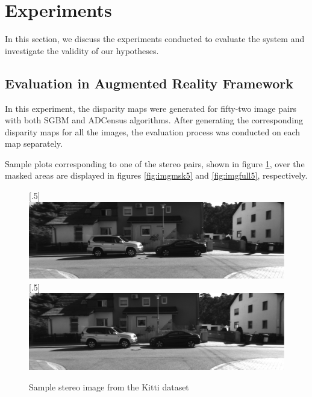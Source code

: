 
\section{Experiments}
In this section, we discuss the experiments conducted to evaluate the system and investigate the validity of our hypotheses.

\subsection{Evaluation in Augmented Reality Framework}

In this experiment, the disparity maps 
were generated for fifty-two image pairs with both SGBM and ADCensus algorithms. 
After generating the corresponding disparity maps for all the images, 
the evaluation process was conducted on each map separately.

Sample plots corresponding to one of the stereo pairs, shown in figure \ref{fig:img5},
over the masked areas are displayed in figures \ref{fig:imgmsk5} and \ref{fig:imgfull5}, respectively.

\begin{figure}[h!]
\centering
{}
[.5\linewidth]{\includegraphics[scale=0.21]{000005L}}%
[.5\linewidth]{\includegraphics[scale=0.21]{000005R}}%
\caption{Sample stereo image from the Kitti dataset}
\label{fig:img5}
\end{figure}

